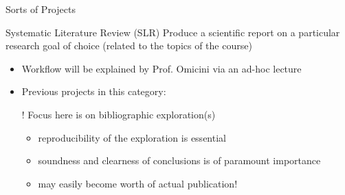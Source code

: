 \documentclass[presentation]{beamer}\mode<presentation>{\usetheme{AMSBolognaFC}}
\begin{document}
\begin{frame}[c, allowframebreaks]{Sorts of Projects}
    \begin{block}{Systematic Literature Review (SLR)}
        Produce a scientific report on a particular research goal of choice (related to the topics of the course)
        \begin{itemize}
            \item Workflow will be explained by Prof. Omicini via an ad-hoc lecture
            \item Previous projects in this category: 
            \item[!] Focus here is on bibliographic exploration(s)
            \begin{itemize}
                \item reproducibility of the exploration is essential
                \item soundness and clearness of conclusions is of paramount importance
                \item may easily become worth of actual publication!
            \end{itemize}
        \end{itemize}
    \end{block}
\end{frame}

\section*{}

\frame{\titlepage}

\section*{\refname}

\begin{frame}{\refname}
	\scriptsize
	
	
\end{frame}

\end{document}
